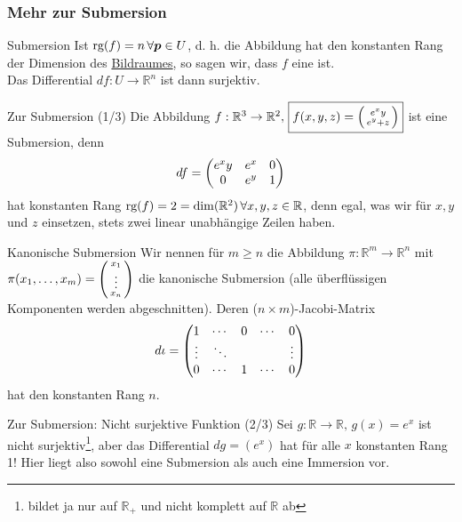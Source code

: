 \subsubsection{Mehr zur Submersion}
\begin{Def}
{Submersion}
Ist $\text{rg}(f)=n\,\forall {{\text{\boldmath${p}$}}}\in U$, d. h. die Abbildung hat den konstanten Rang der Dimension des \underline{Bildraumes}, so sagen wir, dass $f$ eine  ist.\\
Das Differential $df:U\to\mathbb{R}^n$ ist dann surjektiv.
\end{Def}
\begin{Beispiel}
{Zur Submersion (1/3)}
Die Abbildung $f:\mathbb{R}^3\to\mathbb{R}^2,\,\boxed{f(x,y,z)=\left(\begin{smallmatrix}e^xy\\e^y+z\end{smallmatrix}\right)}$ ist eine Submersion, denn
\begin{equation*}
    df=\begin{pmatrix}e^xy&e^x&0\\0&e^y&1\end{pmatrix}
\end{equation*}
hat konstanten Rang $\text{rg}(f)=2=\dim(\mathbb{R}^2)\,\forall x,y,z\in\mathbb{R}$, denn egal, was wir für $x,y$ und $z$ einsetzen, stets zwei linear unabhängige Zeilen haben.
\end{Beispiel}
\begin{Def}
{Kanonische Submersion}
Wir nennen für $m\geq n$ die Abbildung $\pi:\mathbb{R}^m\to\mathbb{R}^n$ mit $\pi(x_1,\ldots,x_m)=\left(\begin{smallmatrix}x_1\\\vdots\\x_n\end{smallmatrix}\right)$ die kanonische Submersion (alle überflüssigen Komponenten werden abgeschnitten). Deren ($n\times m$)-Jacobi-Matrix
\begin{equation*}
    d\iota=\begin{pmatrix}1&\cdots&0&\cdots&0\\\vdots&\ddots&&&\vdots\\0&\cdots&1&\cdots&0\end{pmatrix}
\end{equation*}
hat den konstanten Rang $n$.
\end{Def}
\begin{Beispiel}
{Zur Submersion: Nicht surjektive Funktion (2/3)}
Sei $g:\mathbb{R}\to\mathbb{R},\,\boxed{g(x)=e^x}$ ist nicht surjektiv\footnote{bildet ja nur auf $\mathbb{R}_+$ und nicht komplett auf $\mathbb{R}$ ab}, aber das Differential $dg=(e^x)$ hat für alle $x$ konstanten Rang 1! Hier liegt also sowohl eine Submersion als auch eine Immersion vor.
\end{Beispiel}
